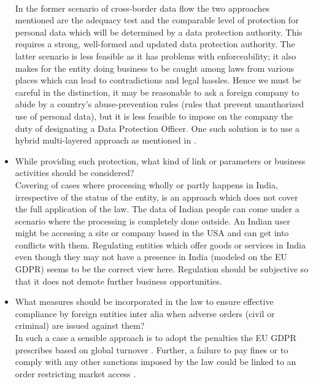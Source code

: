 \begin{itemize}
	\\
	In the former scenario of cross-border data flow the two approaches mentioned are the adequacy test and the comparable level of protection for personal data which will be determined by a data protection authority. This requires a strong, well-formed and updated data protection authority. The latter scenario is less feasible as it has problems with enforceability; it also makes for the entity doing business to be caught among laws from various places which can lead to contradictions and legal hassles. Hence we must be careful in the distinction, it may be reasonable to ask a foreign company to abide by a country's abuse-prevention rules (rules that prevent unauthorized use of personal data), but it is less feasible to impose on the company the duty of designating a Data Protection Officer. One such solution is to use a hybrid multi-layered approach as mentioned in \cite{layeredapp}.
\item While providing such protection, what kind of link or parameters or business activities should be considered?
\\
Covering of cases where processing wholly or partly happens in India, irrespective of the status of the entity, is an approach which does not cover the full application of the law. The data of Indian people can come under a scenario where the processing is completely done outside. An Indian user might be accessing a site or company based in the USA and can get into conflicts with them. Regulating entities which offer goods or services in India even though they may not have a presence in India (modeled on the EU GDPR) seems to be the correct view here. Regulation should be subjective so that it does not demote further business opportunities.
\item What measures should be incorporated in the law to ensure effective compliance by foreign entities inter alia when adverse orders (civil or criminal) are issued against them?
\\
In such a case a sensible approach is to adopt the penalties the EU GDPR prescribes based on global turnover \cite{eugp83}. Further, a failure to pay fines or to comply with any other sanctions imposed by the law could be linked to an order restricting market access \cite{dataindo}.
\end{itemize}
